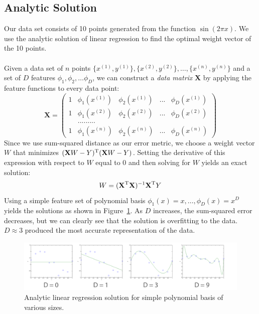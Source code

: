 \documentclass[11pt]{article}   %
\theoremstyle{plain}
\begin{document}
\subsection{Analytic Solution}
Our data set consists of 10 points generated from the function $\sin(2 \pi x)$. We  use the analytic solution of linear regression to find the optimal weight vector of the 10 points. \\
\\
\indent Given a data set of $n$ points $\{ x^{(1)}, y^{(1)} \}, \{ x^{(2)}, y^{(2)} \}, \ldots, \{ x^{(n)}, y^{(n)} \}$ and a set of $D$ features $\phi_1, \phi_2, \ldots \phi_D$, we can construct a \textit{data matrix} \textbf{X} by applying the feature functions to every data point: \\
	 \[ \textbf{X} = \left( \begin{array}{ccccc}
1 & \phi_1(x^{(1)}) & \phi_2(x^{(1)}) & ... & \phi_D(x^{(1)}) \\
1 & \phi_1(x^{(2)}) & \phi_2(x^{(2)}) & ... & \phi_D(x^{(2)}) \\
& ......... \\
1 & \phi_1(x^{(n)}) & \phi_2(x^{(n)}) & ... & \phi_D(x^{(n)}) \end{array} \right)\] 
Since we use sum-squared distance as our error metric, we choose a weight vector $W$ that minimizes $(\textbf{X}W - Y)^\textnormal{T} (\textbf{X}W - Y)$. Setting the derivative of this expression with respect to $W$ equal to 0 and then solving for $W$ yields an exact solution:
\begin{equation} \label{eq-analytic}
	W = (\textbf{X}^\textnormal{T}\textbf{X})^{-1}\textbf{X}^{\textnormal{T}}Y
\end{equation}
\indent Using a simple feature set of polynomial basis $\phi_1(x) = x,\ldots,\phi_D(x) = x^D$ yields the solutions as shown in Figure~\ref{fig-analytic}. As $D$ increases, the sum-squared error decreases, but we can clearly see that the solution is overfitting to the data. $D \approx 3$ produced the most accurate representation of the data. 
\begin{figure}[h!]\label{fig-analytic}
  \caption{Analytic linear regression solution for simple polynomial basis of various sizes.}
  \centering
    \includegraphics[width=1.0\textwidth]{figures/problem_2_1_full.png}
\end{figure}
\end{document}

